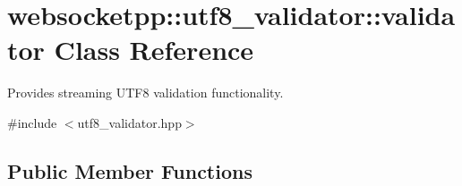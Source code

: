 \hypertarget{classwebsocketpp_1_1utf8__validator_1_1validator}{}\section{websocketpp\+:\+:utf8\+\_\+validator\+:\+:validator Class Reference}
\label{classwebsocketpp_1_1utf8__validator_1_1validator}


Provides streaming U\+T\+F8 validation functionality.  




{\ttfamily \#include $<$utf8\+\_\+validator.\+hpp$>$}

\subsection*{Public Member Functions}
